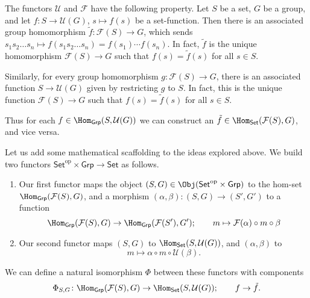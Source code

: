 \documentclass[notes.tex]{subfiles}
\begin{document}
The functors $\mathcal{U}$ and $\mathcal{F}$ have the following property. Let $S$ be a set, $G$ be a group, and let $f\colon S \to \mathcal{U}(G)$, $s \mapsto f(s)$ be a set-function. Then there is an associated group homomorphism $\tilde{f}\colon \mathcal{F}(S) \to G$, which sends $s_{1}s_{2}\dots s_{n} \mapsto f(s_{1}s_{2}\dots s_{n}) = f(s_{1})\cdots f(s_{n})$. In fact, $\tilde{f}$ is the unique homomorphism $\mathcal{F}(S) \to G$ such that $f(s) = \tilde{f}(s)$ for all $s \in S$.

Similarly, for every group homomorphism $g\colon \mathcal{F}(S) \to G$, there is an associated function $S \to \mathcal{U}(G)$ given by restricting $g$ to $S$. In fact, this is the unique function $\mathcal{F}(S) \to G$ such that $f(s) = \tilde{f}(s)$ for all $s \in S$.

Thus for each $f \in \Hom_{\mathsf{Grp}}(S, \mathcal{U}(G))$ we can construct an $\tilde{f} \in \Hom_{\mathsf{Set}}(\mathcal{F}(S), G)$, and vice versa.

Let us add some mathematical scaffolding to the ideas explored above. We build two functors $\mathsf{Set}^{\mathrm{op}} \times \mathsf{Grp} \rightarrow \mathsf{Set}$ as follows.
\begin{enumerate}
  \item Our first functor maps the object $(S, G) \in \Obj(\mathsf{Set}^{\mathrm{op}} \times \mathsf{Grp})$ to the hom-set $\Hom_{\mathsf{Grp}}(\mathcal{F}(S), G)$, and a morphism $(\alpha, \beta)\colon (S,G) \to (S', G')$ to a function
    \begin{equation*}
      \Hom_{\mathsf{Grp}}(\mathcal{F}(S), G) \to \Hom_{\mathsf{Grp}}(\mathcal{F}(S'), G');\qquad m \mapsto \mathcal{F}(\alpha) \circ m \circ \beta
    \end{equation*}

  \item Our second functor maps $(S, G)$ to $\Hom_{\mathsf{Set}}(S, \mathcal{U}(G))$, and $(\alpha, \beta)$ to
    \begin{equation*}
      m \mapsto \alpha \circ m \circ \mathcal{U}(\beta).
    \end{equation*}
\end{enumerate}
We can define a natural isomorphism $\Phi$ between these functors with components
\begin{equation*}
  \Phi_{S, G}\colon \Hom_{\mathsf{Grp}}(\mathcal{F}(S), G) \to \Hom_{\mathsf{Set}}(S, \mathcal{U}(G));\qquad f \to \tilde{f}.
\end{equation*}
\end{document}
